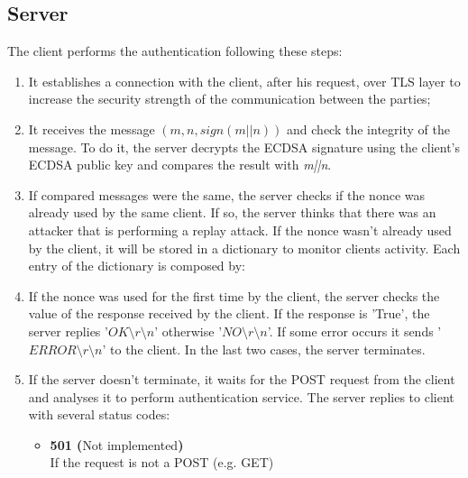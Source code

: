 \subsection{Server}
The client performs the authentication following these steps:
\begin{enumerate}
\item{It establishes a connection with the client, after his request, over TLS layer to increase the security strength of the communication between the parties;}
\item{It receives the message $(m, n, sign(m||n))$ and check the integrity of the message. To do it, the server decrypts the ECDSA signature using the client's ECDSA public key and compares the result with \textit{m||n}.}
\item{If compared messages were the same, the server checks if the nonce was already used by the same client. If so, the server thinks that there was an attacker that is performing a replay attack. If the nonce wasn't already used by the client, it will be stored in a dictionary to monitor clients activity. Each entry of the dictionary is composed by:
\begin{itemize}
\end{itemize}
}
\item{If the nonce was used for the first time by the client, the server checks the value of the response received by the client. If the response is 'True', the server replies '$OK\setminus r\setminus n$' otherwise '$NO\setminus r\setminus n$'. If some error occurs it sends '$ERROR\setminus r\setminus n$' to the client. In the last two cases, the server terminates.}
\item{If the server doesn't terminate, it waits for the POST request from the client and analyses it to perform authentication service. The server replies to client with several status codes:
\begin{itemize}
\item{\textbf{501 (}Not implemented\textbf{)}\\
If the request is not a POST (e.g. GET)}

\end{itemize}}
\end{enumerate}

